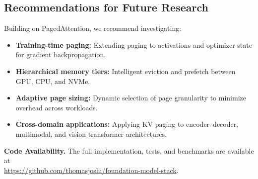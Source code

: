 \documentclass[conference]{IEEEtran}
\begin{document}
\subsection{Recommendations for Future Research}
Building on PagedAttention, we recommend investigating:
\begin{itemize}[leftmargin=*]
  \item \textbf{Training-time paging:} Extending paging to activations and optimizer state for gradient backpropagation.
  \item \textbf{Hierarchical memory tiers:} Intelligent eviction and prefetch between GPU, CPU, and NVMe.
  \item \textbf{Adaptive page sizing:} Dynamic selection of page granularity to minimize overhead across workloads.
  \item \textbf{Cross-domain applications:} Applying KV paging to encoder–decoder, multimodal, and vision transformer architectures.
\end{itemize}

\vspace{0.5em}
\noindent\textbf{Code Availability.} The full implementation, tests, and benchmarks are available at\\
\url{https://github.com/thomasjoshi/foundation-model-stack}.
\end{document}
